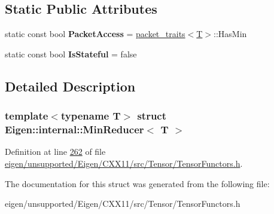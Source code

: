 \subsection*{Static Public Attributes}
\begin{DoxyCompactItemize}
\item 
\mbox{\label{struct_eigen_1_1internal_1_1_min_reducer_ae6cb997bf791c7ae95c2ae283579c954}} 
static const bool {\bfseries Packet\+Access} = \hyperlink{struct_eigen_1_1internal_1_1packet__traits}{packet\+\_\+traits}$<$\hyperlink{group___sparse_core___module}{T}$>$\+::Has\+Min
\item 
\mbox{\label{struct_eigen_1_1internal_1_1_min_reducer_a8581b5279f3bebe6d5ca387b2a6e2a40}} 
static const bool {\bfseries Is\+Stateful} = false
\end{DoxyCompactItemize}


\subsection{Detailed Description}
\subsubsection*{template$<$typename T$>$\newline
struct Eigen\+::internal\+::\+Min\+Reducer$<$ T $>$}



Definition at line \hyperlink{eigen_2unsupported_2_eigen_2_c_x_x11_2src_2_tensor_2_tensor_functors_8h_source_l00262}{262} of file \hyperlink{eigen_2unsupported_2_eigen_2_c_x_x11_2src_2_tensor_2_tensor_functors_8h_source}{eigen/unsupported/\+Eigen/\+C\+X\+X11/src/\+Tensor/\+Tensor\+Functors.\+h}.



The documentation for this struct was generated from the following file\+:\begin{DoxyCompactItemize}
\item 
eigen/unsupported/\+Eigen/\+C\+X\+X11/src/\+Tensor/\+Tensor\+Functors.\+h\end{DoxyCompactItemize}
